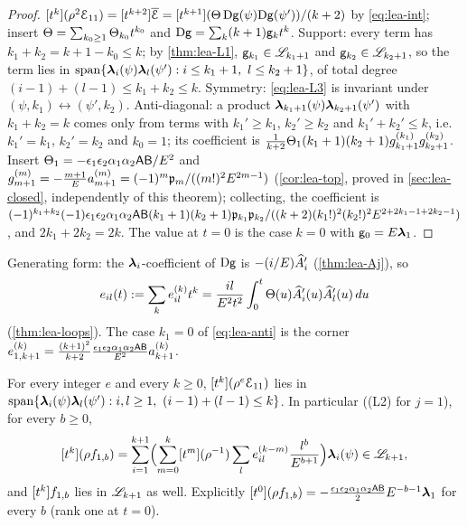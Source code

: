 \begin{proof}
$[t^k](\rho^2\mathcal{E}_{11}) = [t^{k+2}]\overline{\mathcal{E}} = [t^{k+1}](\Theta\,\mathrm{D}\mathsf{g}(\psi)\mathrm{D}\mathsf{g}(\psi'))/(k+2)$ by \eqref{eq:lea-int}; insert $\Theta = \sum_{k_0\geq 1}\Theta_{k_0}t^{k_0}$ and $\mathrm{D}\mathsf{g} = \sum_k(k+1)\mathsf{g}_kt^k$. Support: every term has $k_1+k_2 = k+1-k_0\leq k$; by \cref{thm:lea-L1}, $\mathsf{g}_{k_1}\in\mathscr{L}_{k_1+1}$ and $\mathsf{g}_{k_2}\in\mathscr{L}_{k_2+1}$, so the term lies in $\operatorname{span}\{\boldsymbol{\lambda}_i(\psi)\boldsymbol{\lambda}_l(\psi') : i\leq k_1+1,\ l\leq k_2+1\}$, of total degree $(i-1)+(l-1)\leq k_1+k_2\leq k$. Symmetry: \eqref{eq:lea-L3} is invariant under $(\psi,k_1)\leftrightarrow(\psi',k_2)$. Anti-diagonal: a product $\boldsymbol{\lambda}_{k_1+1}(\psi)\boldsymbol{\lambda}_{k_2+1}(\psi')$ with $k_1+k_2 = k$ comes only from terms with $k_1'\geq k_1$, $k_2'\geq k_2$ and $k_1'+k_2'\leq k$, i.e.\ $k_1' = k_1$, $k_2' = k_2$ and $k_0 = 1$; its coefficient is $\frac{1}{k+2}\Theta_1(k_1+1)(k_2+1)g^{(k_1)}_{k_1+1}g^{(k_2)}_{k_2+1}$. Insert $\Theta_1 = -\epsilon_1\epsilon_2\alpha_1\alpha_2\mathsf{A}\mathsf{B}/E^2$ and $g^{(m)}_{m+1} = -\frac{m+1}{E}a^{(m)}_{m+1} = (-1)^m\mathfrak{p}_m/((m!)^2E^{2m-1})$ (\cref{cor:lea-top}, proved in \cref{sec:lea-closed}, independently of this theorem); collecting, the coefficient is $(-1)^{k_1+k_2}(-1)\epsilon_1\epsilon_2\alpha_1\alpha_2\mathsf{A}\mathsf{B}(k_1+1)(k_2+1)\mathfrak{p}_{k_1}\mathfrak{p}_{k_2}/((k+2)(k_1!)^2(k_2!)^2E^{2+2k_1-1+2k_2-1})$, and $2k_1+2k_2 = 2k$. The value at $t = 0$ is the case $k = 0$ with $\mathsf{g}_0 = E\boldsymbol{\lambda}_1$.
\end{proof}

Generating form: the $\boldsymbol{\lambda}_i$-coefficient of $\mathrm{D}\mathsf{g}$ is $-(i/E)\widehat{A}_i'$ (\cref{thm:lea-Aj}), so
\[
e_{il}(t) := \sum_ke^{(k)}_{il}t^k = \frac{il}{E^2t^2}\int_0^t\Theta(u)\widehat{A}_i'(u)\widehat{A}_l'(u)\,du
\]
(\cref{thm:lea-loops}). The case $k_1 = 0$ of \eqref{eq:lea-anti} is the corner $e^{(k)}_{1,k+1} = \frac{(k+1)^2}{k+2}\frac{\epsilon_1\epsilon_2\alpha_1\alpha_2\mathsf{A}\mathsf{B}}{E^2}a^{(k)}_{k+1}$.

\begin{cor}[powers of $\rho$; (L2) for $j = 1$]
\label{cor:lea-rhoe}
For every integer $e$ and every $k\geq 0$, $[t^k](\rho^e\mathcal{E}_{11})$ lies in $\operatorname{span}\{\boldsymbol{\lambda}_i(\psi)\boldsymbol{\lambda}_l(\psi') : i,l\geq 1,\ (i-1)+(l-1)\leq k\}$. In particular ((L2) for $j = 1$), for every $b\geq 0$,
\begin{equation}
\label{eq:lea-L2one}
[t^k](\rho f_{1,b}) = \sum_{i=1}^{k+1}\Bigl(\sum_{m=0}^{k}[t^m](\rho^{-1})\sum_le^{(k-m)}_{il}\frac{l^b}{E^{b+1}}\Bigr)\boldsymbol{\lambda}_i(\psi)\in\mathscr{L}_{k+1},
\end{equation}
and $[t^k]f_{1,b}$ lies in $\mathscr{L}_{k+1}$ as well. Explicitly $[t^0](\rho f_{1,b}) = -\frac{\epsilon_1\epsilon_2\alpha_1\alpha_2\mathsf{A}\mathsf{B}}{2}E^{-b-1}\boldsymbol{\lambda}_1$ for every $b$ (rank one at $t = 0$).
\end{cor}

